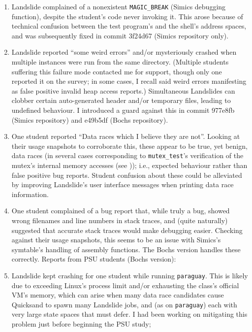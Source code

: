 \begin{enumerate}
	\item Landslide complained of a nonexistent {\tt MAGIC\_BREAK} (Simics debugging function),
		despite the student's code never invoking it.
		This arose because of technical confusion between the test program's and the shell's address spaces,
		and was subsequently fixed in commit 3f24d67 (Simics repository only).
	\item Landslide reported ``some weird errors'' and/or mysteriously crashed
		when multiple instances were run from the same directory.
		(Multiple students suffering this failure mode contacted me for support,
		though only one reported it on the survey;
		in some cases, I recall said weird errors manifesting as false positive invalid heap access reports.)
		Simultaneous Landslides can clobber certain auto-generated header and/or temporary files,
		leading to undefined behaviour.
		I introduced a guard against this in commit 977e8fb (Simics repository) and e49b5df (Bochs repository).
	\item One student reported ``Data races which I believe they are not''.
		Looking at their usage snapshots to corroborate this,
		these appear to be true, yet benign, data races
		(in several cases corresponding to {\tt mutex\_test}'s verification of the mutex's internal memory accesses
		(see \sect{\ref{sec:education-pebbles-tests}}));
		i.e., expected behaviour rather than false positive bug reports.
		Student confusion about these could be alleviated
		by improving Landslide's user interface messages when printing data race information. %
	\item One student complained of a bug report that, while truly a bug, showed wrong filenames and line numbers in stack traces,
		and (quite naturally) suggested that accurate stack traces would make debugging easier.
		Checking against their usage snapshots,
		this seems to be an issue with Simics's symtable's handling of assembly functions.
		The Bochs version handles these correctly.
Reports from PSU students (Bochs version):
	\item Landslide kept crashing for one student while running {\tt paraguay}.
		This is likely due to exceeding Linux's process limit and/or exhausting the class's official VM's memory,
		which can arise when many data race candidates cause Quicksand to spawn many Landslide jobs,
		and (as on {\tt paraguay}) each with very large state spaces that must defer.
		I had been working on mitigating this problem just before beginning the PSU study;

\end{enumerate}
